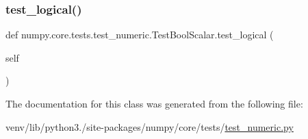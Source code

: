 \subsubsection{\texorpdfstring{test\+\_\+logical()}{test\_logical()}}
{\footnotesize\ttfamily def numpy.\+core.\+tests.\+test\+\_\+numeric.\+Test\+Bool\+Scalar.\+test\+\_\+logical (\begin{DoxyParamCaption}\item[{}]{self }\end{DoxyParamCaption})}



The documentation for this class was generated from the following file\+:\begin{DoxyCompactItemize}
\item 
venv/lib/python3./site-\/packages/numpy/core/tests/\hyperlink{core_2tests_2test__numeric_8py}{test\+\_\+numeric.\+py}\end{DoxyCompactItemize}
